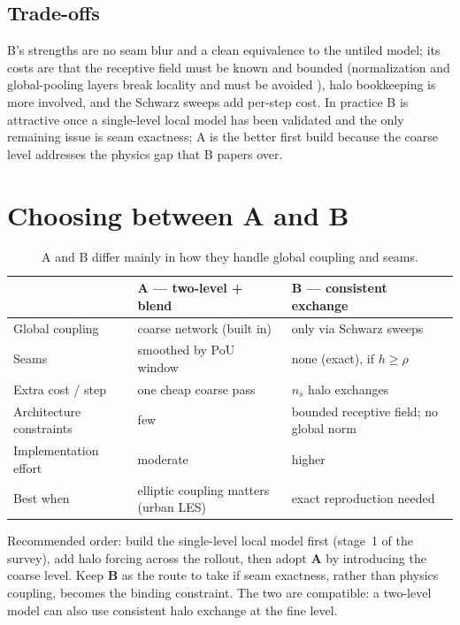 \documentclass[11pt]{article}
\begin{document}
\subsection{Trade-offs}
B's strengths are no seam blur and a clean equivalence to the untiled model; its
costs are that the receptive field must be known and bounded (normalization and
global-pooling layers break locality and must be avoided
\cite{buglakova2025tiling}), halo bookkeeping is more involved, and the Schwarz
sweeps add per-step cost. In practice B is attractive once a single-level local
model has been validated and the only remaining issue is seam exactness; A is the
better first build because the coarse level addresses the physics gap that B
papers over.

\section{Choosing between A and B}\label{sec:choice}

\begin{table}[h]
\centering\small
\begin{tabularx}{\textwidth}{@{}l Y Y@{}}
\toprule
 & \textbf{A --- two-level + blend} & \textbf{B --- consistent exchange} \\
\midrule
Global coupling & coarse network (built in) & only via Schwarz sweeps \\
Seams & smoothed by PoU window & none (exact), if $h\ge\rho$ \\
Extra cost / step & one cheap coarse pass & $n_s$ halo exchanges \\
Architecture constraints & few & bounded receptive field; no global norm \\
Implementation effort & moderate & higher \\
Best when & elliptic coupling matters (urban LES) & exact reproduction needed \\
\bottomrule
\end{tabularx}
\caption{A and B differ mainly in how they handle global coupling and seams.}
\label{tab:choice}
\end{table}

\noindent
Recommended order: build the single-level local model first (stage~1 of the
survey), add halo forcing across the rollout, then adopt \textbf{A} by introducing
the coarse level. Keep \textbf{B} as the route to take if seam exactness, rather
than physics coupling, becomes the binding constraint. The two are compatible: a
two-level model can also use consistent halo exchange at the fine level.
\end{document}
